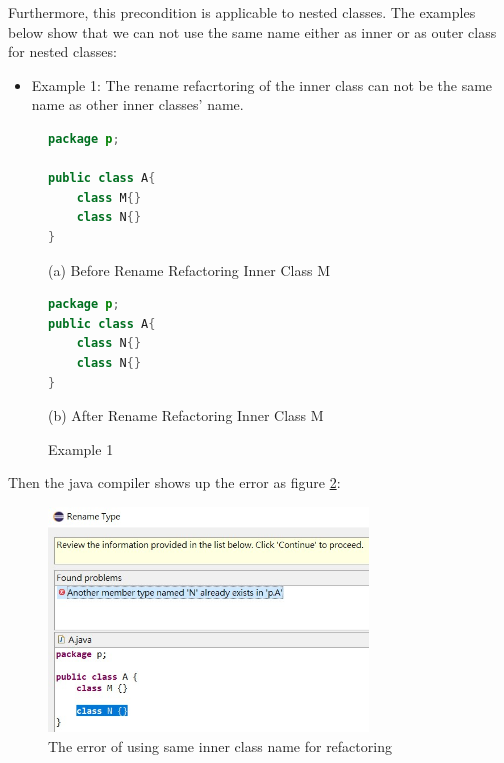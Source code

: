 Furthermore, this precondition is applicable to nested classes. The examples below show that we can not use the same name either as inner or as outer class for nested classes:

\begin{itemize}
\item Example 1: The rename refacrtoring of the inner class can not be the same name as other inner classes' name.
\end{itemize}

\begin{figure}[th]
\centering
\begin{minipage}[t]{0.6\linewidth}
\begin{lstlisting}[language=java, basicstyle=\scriptsize\ttfamily,frame=single]
package p;

public class A{	
    class M{}
    class N{}
} 
\end{lstlisting}
\tiny{(a) Before Rename Refactoring Inner Class M}
\end{minipage}
\hfill


\begin{minipage}[t]{0.6\linewidth}
\begin{lstlisting}[language=java, basicstyle=\scriptsize\ttfamily,frame=single]
package p;
public class A{	
    class N{}
    class N{}
} 
\end{lstlisting}
\tiny{(b) After Rename Refactoring Inner Class M}
\end{minipage}
\caption{Example 1}
\label{fig:nestedclass1}
\end{figure}

Then the java compiler shows up the error as figure \ref{fig:NC1}:

\begin{figure}[H]
\centerline{\includegraphics[width=85mm,scale=0.5]{NC1.jpg}}
\caption{The error of using same inner class name for refactoring}
\label{fig:NC1}
\end{figure}

